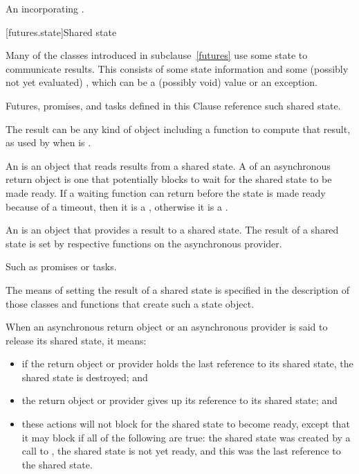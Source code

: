 \begin{itemdescr}
\pnum
\returns
An \ntbs{} incorporating .
\end{itemdescr}

[futures.state]{Shared state}

\pnum
Many of the classes introduced in subclause~\ref{futures} use some state to communicate results. This
 consists of some state information and some (possibly not
yet evaluated) , which can be a (possibly void) value or an exception.
\begin{note}
Futures, promises, and tasks defined in this Clause reference such shared state.
\end{note}

\pnum
\begin{note}
The result can be any kind of object including a function to compute that result,
as used by  when  is .
\end{note}

\pnum
An  is an object that reads results from a
shared state. A  of an asynchronous return object is one
that potentially blocks to wait for the shared state to be made
ready.
If a waiting function can return before the state is made ready because of a
timeout, then it is a , otherwise
it is a .

\pnum
An  is an object that provides a result to a shared
state.
The result of a shared state is set by
respective functions on the asynchronous provider.
\begin{note}
Such as promises or tasks.
\end{note}
The means of setting the result of a shared state is specified
in the description of those classes and functions that create such a state object.

\pnum
When an asynchronous return object or an asynchronous provider is said to release its
shared state, it means:
\begin{itemize}
\item
if the return object or provider holds the last reference to its shared state,
the shared state is destroyed; and

\item
the return object or provider gives up its reference to its shared state; and

\item these actions will not block for the shared state to become ready, except that it
may block if all of the following are true: the shared state was created by a call to
, the shared state is not yet ready, and this was the last reference
to the shared state.
\end{itemize}

